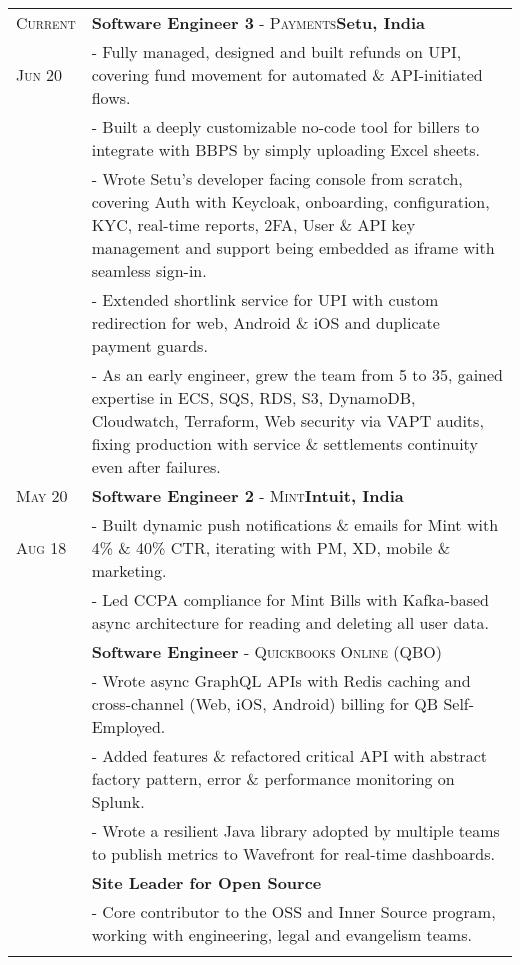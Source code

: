\documentclass[a4paper,10pt]{extarticle} %
\begin{document}
\begin{tabularx}{\linewidth}{ l | X }

\textsc{Current} & \textbf{Software Engineer 3} \textsc{- Payments}\hfill\textbf{Setu, India}\\
\textsc{Jun 20} & {- Fully managed, designed and built refunds on UPI, covering fund movement for automated \& API-initiated flows.}\\
& {- Built a deeply customizable no-code tool for billers to integrate with BBPS by simply uploading Excel sheets.}\\
& {- Wrote Setu's developer facing console from scratch, covering Auth with Keycloak, onboarding, configuration, KYC, real-time reports, 2FA, User \& API key management and support being embedded as iframe with seamless sign-in.}\\
& {- Extended shortlink service for UPI with custom redirection for web, Android \& iOS and duplicate payment guards.}\\
& {- As an early engineer, grew the team from 5 to 35, gained expertise in ECS, SQS, RDS, S3, DynamoDB, Cloudwatch, Terraform, Web security via VAPT audits, fixing production with service \& settlements continuity even after failures.}
\multicolumn{2}{c}{} \\

\textsc{May 20} & \textbf{Software Engineer 2} \textsc{- Mint}\hfill\textbf{Intuit, India}\\
\textsc{Aug 18} & {- Built dynamic push notifications \& emails for Mint with 4\% \& 40\% CTR, iterating with PM, XD, mobile \& marketing.}\\
& {- Led CCPA compliance for Mint Bills with Kafka-based async architecture for reading and deleting all user data.}\\
& \textbf{Software Engineer} \textsc{- Quickbooks Online (QBO)}\\
& {- Wrote async GraphQL APIs with Redis caching and cross-channel (Web, iOS, Android) billing for QB Self-Employed.}\\
& {- Added features \& refactored critical API with abstract factory pattern, error \& performance monitoring on Splunk.}\\
& {- Wrote a resilient Java library adopted by multiple teams to publish metrics to Wavefront for real-time dashboards.}\\
& \textbf{Site Leader for Open Source}\\
& {- Core contributor to the OSS and Inner Source program, working with engineering, legal and evangelism teams.}\\
\multicolumn{2}{c}{} \\


\end{tabularx}
\end{document}
